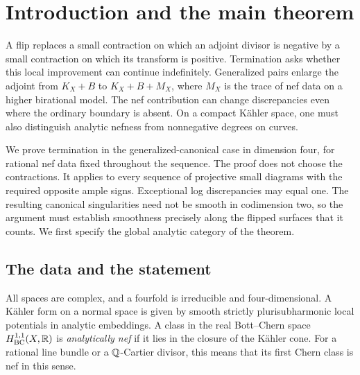 \begin{abstract}
Every sequence of generalized-canonical flips on compact K\"ahler
fourfolds with rational boundary and fixed rational analytically nef
b-divisor terminates when the small morphisms are projective. We prove
this for normal globally Weil $\Q$-factorial models with boundary
coefficients less than one, allowing exceptional log discrepancies equal
to one. No scaling rule or pseudo-effectivity assumption is required.
The theorem applies to existing projective small diagrams with the
specified opposite ample signs.
\end{abstract}

\section{Introduction and the main theorem}\label{sec:introduction}

A flip replaces a small contraction on which an adjoint divisor is
negative by a small contraction on which its transform is positive.
Termination asks whether this local improvement can continue
indefinitely. Generalized pairs enlarge the adjoint from $K_X+B$ to
$K_X+B+M_X$, where $M_X$ is the trace of nef data on a higher
birational model. The nef contribution can change discrepancies even
where the ordinary boundary is absent. On a compact K\"ahler space,
one must also distinguish analytic nefness from nonnegative degrees
on curves.

We prove termination in the generalized-canonical case in dimension
four, for rational nef data fixed throughout the sequence. The proof
does not choose the contractions. It applies to every sequence of
projective small diagrams with the required opposite ample signs.
Exceptional log discrepancies may equal one. The resulting canonical
singularities need not be smooth in codimension two, so the argument
must establish smoothness precisely along the flipped surfaces that
it counts. We first specify the global analytic category of the theorem.

\subsection{The data and the statement}

All spaces are complex, and a fourfold is irreducible and
four-dimensional. A K\"ahler form on a normal space is
given by smooth strictly plurisubharmonic local potentials in analytic
embeddings. A class in the real Bott--Chern space
$H^{1,1}_{\mathrm{BC}}(X,\mathbb R)$ is \emph{analytically nef} if it lies
in the closure of the K\"ahler cone. For a rational line bundle or
a $\Q$-Cartier divisor, this means that its first Chern class is nef
in this sense.

